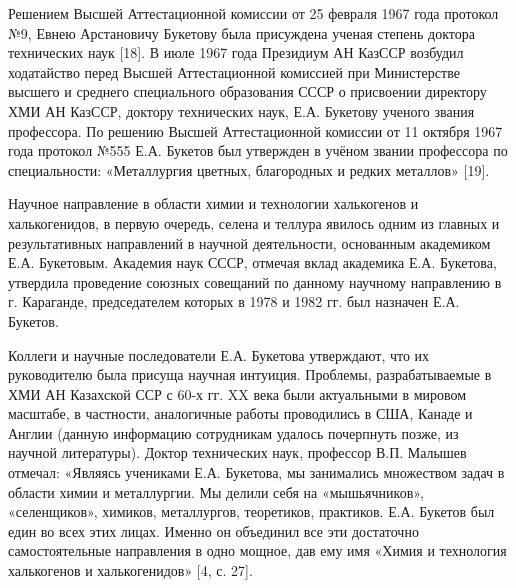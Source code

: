 Решением Высшей Аттестационной комиссии от 25 февраля 1967 года протокол
№9, Евнею Арстановичу Букетову была присуждена ученая степень доктора
технических наук {[}18{]}. В июле 1967 года Президиум АН КазССР возбудил
ходатайство перед Высшей Аттестационной комиссией при Министерстве
высшего и среднего специального образования СССР о присвоении директору
ХМИ АН КазССР, доктору технических наук, Е.А. Букетову ученого звания
профессора. По решению Высшей Аттестационной комиссии от 11 октября 1967
года протокол №555 Е.А. Букетов был утвержден в учёном звании профессора
по специальности: «Металлургия цветных, благородных и редких металлов»
{[}19{]}.

Научное направление в области химии и технологии халькогенов и
халькогенидов, в первую очередь, селена и теллура явилось одним из
главных и результативных направлений в научной деятельности, основанным
академиком Е.А. Букетовым. Академия наук СССР, отмечая вклад академика
Е.А. Букетова, утвердила проведение союзных совещаний по данному
научному направлению в г. Караганде, председателем которых в 1978 и 1982
гг. был назначен Е.А. Букетов.

Коллеги и научные последователи Е.А. Букетова утверждают, что их
руководителю была присуща научная интуиция. Проблемы, разрабатываемые в
ХМИ АН Казахской ССР с 60-х гг. XX века были актуальными в мировом
масштабе, в частности, аналогичные работы проводились в США, Канаде и
Англии (данную информацию сотрудникам удалось почерпнуть позже, из
научной литературы). Доктор технических наук, профессор В.П. Малышев
отмечал: «Являясь учениками Е.А. Букетова, мы занимались множеством
задач в области химии и металлургии. Мы делили себя на «мышьячников»,
«селенщиков», химиков, металлургов, теоретиков, практиков. Е.А. Букетов
был един во всех этих лицах. Именно он объединил все эти достаточно
самостоятельные направления в одно мощное, дав ему имя «Химия и
технология халькогенов и халькогенидов» {[}4, с. 27{]}.

